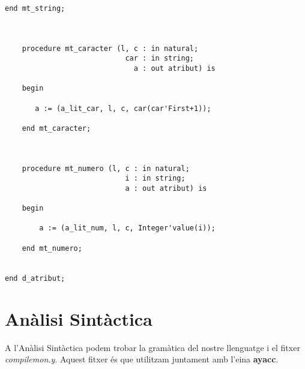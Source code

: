 \documentclass[10pt]{report}
\begin{document}
\begin{lstlisting}[style=Ada]
    end mt_string;
    
    

    procedure mt_caracter (l, c : in natural; 
                            car : in string; 
                              a : out atribut) is
    
    begin
    
       a := (a_lit_car, l, c, car(car'First+1));
       
    end mt_caracter;
        
        
        
    procedure mt_numero (l, c : in natural; 
                            i : in string; 
                            a : out atribut) is
    
    begin
    
        a := (a_lit_num, l, c, Integer'value(i));
        
    end mt_numero;
    

end d_atribut;
    \end{lstlisting}
    \newpage
    
    
    \chapter{Anàlisi Sintàctica}
    A l'Anàlisi Sintàctica podem trobar la gramàtica del nostre llenguatge i el fitxer \textit{compilemon.y}. Aquest fitxer és que utilitzam juntament amb l'eina \textbf{ayacc}.
    
\end{document}
